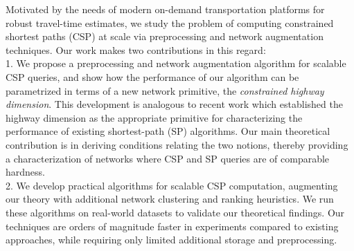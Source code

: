 Motivated by the needs of modern on-demand transportation platforms for robust travel-time estimates, we study the problem of computing constrained shortest paths (CSP) at scale via preprocessing and network augmentation techniques.
Our work makes two contributions in this regard:\\
1. We propose a preprocessing and network augmentation algorithm for scalable CSP queries, and show how the performance of our algorithm can be parametrized in terms of a new network primitive, the \emph{constrained highway dimension}. 
This development is analogous to recent work which established the highway dimension as the appropriate primitive for characterizing the performance of existing shortest-path (SP) algorithms. 
Our main theoretical contribution is in deriving conditions relating the two notions, thereby providing a characterization of networks where CSP and SP queries are of comparable hardness.\\
2. We develop practical algorithms for scalable CSP computation, augmenting our theory with additional network clustering and ranking heuristics. We run these algorithms on real-world datasets to validate our theoretical findings. Our techniques are orders of magnitude faster in experiments compared to existing approaches, while requiring only limited additional storage and preprocessing.